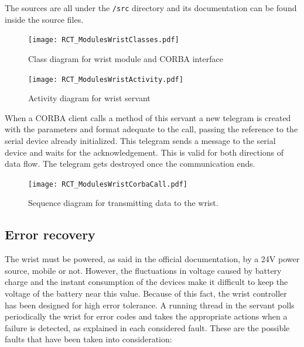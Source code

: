The sources are all under the \texttt{/src} directory and its documentation can be found
inside the source files.

\begin{figure}[htbp]
\begin{center}
 {\texttt{[image: RCT\_ModulesWristClasses.pdf]}}
\end{center}
\caption{Class diagram for wrist module and CORBA interface}
\label{fig:ModulesWristClasses}
\end{figure}

\begin{figure}[htbp]
\begin{center}
 {\texttt{[image: RCT\_ModulesWristActivity.pdf]}}
\end{center}
\caption{Activity diagram for wrist servant}
\label{fig:ModulesWristActivity}
\end{figure}

When a CORBA client calls a method of this servant a new telegram is created with the parameters and format adequate to the call, passing the reference to the serial device already initialized. This telegram sends a message to the serial device and waits for the acknowledgement. This is valid for both directions of data flow. The telegram gets destroyed once the communication ends.

\begin{figure}[htbp]
\begin{center}
 {\texttt{[image: RCT\_ModulesWristCorbaCall.pdf]}}
\end{center}
\caption{Sequence diagram for transmitting data to the wrist.}
\label{fig:ModulesWristSequence}
\end{figure}

\subsection{Error recovery}
The wrist must be powered, as said in the official documentation, by  a 24V
power source, mobile or not. However, the fluctuations in voltage caused by
battery charge and the instant consumption of the devices make it difficult to
keep the voltage of the battery near this value. Because of this fact,
the wrist controller has been designed for high error tolerance.
A running thread in the servant polls periodically the wrist for error codes and
takes the appropriate actions when a failure is detected, as explained in each
considered fault.  These are the
possible faults that have been taken into consideration:
